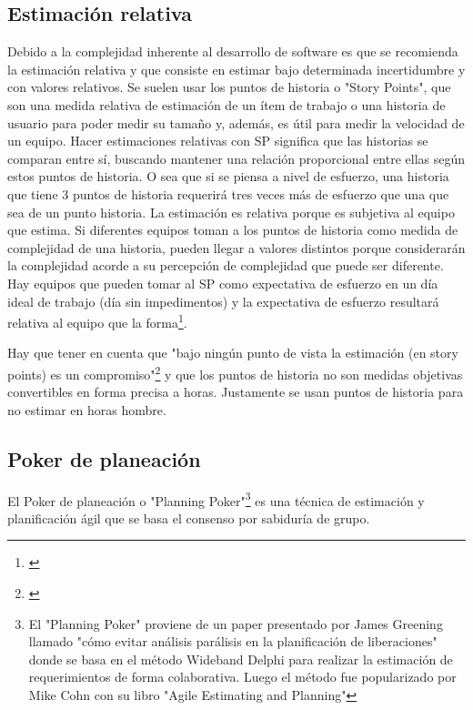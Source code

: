 \subsection{Estimación relativa}

Debido a la complejidad inherente al desarrollo de software es que se recomienda la estimación relativa y que consiste en estimar bajo determinada incertidumbre y con valores relativos. Se suelen usar los puntos de historia o "Story Points", que son una medida relativa de estimación de un ítem de trabajo o una historia de usuario para poder medir su tamaño y, además, es útil para medir la velocidad de un equipo. Hacer estimaciones relativas con SP significa que las historias se comparan entre sí, buscando mantener una relación proporcional entre ellas según estos puntos de historia. O sea que si se piensa a nivel de esfuerzo, una historia que tiene 3 puntos de historia requerirá tres veces más de esfuerzo que una que sea de un punto historia.
La estimación es relativa porque es subjetiva al equipo que estima. Si diferentes equipos toman a los puntos de historia como medida de complejidad de una historia, pueden llegar a valores distintos porque considerarán la complejidad acorde a su percepción de complejidad que puede ser diferente. Hay equipos que pueden tomar al SP como expectativa de esfuerzo en un día ideal de trabajo (día sin impedimentos) y la expectativa de esfuerzo resultará relativa al equipo que la forma\footnote{\cite{Cohn-2004}}.

Hay que tener en cuenta que "bajo ningún punto de vista la estimación (en story points) es un compromiso"\footnote{\cite{UNTREF-2014}} y que los puntos de historia no son medidas objetivas convertibles en forma precisa a horas. Justamente se usan puntos de historia para no estimar en horas hombre.

\subsection{Poker de planeación}

El Poker de planeación o "Planning Poker"\footnote{El "Planning Poker" proviene de un paper presentado por James Greening llamado "cómo evitar análisis parálisis en la planificación de liberaciones"\cite{James-Grenning-2002} donde se basa en el método Wideband Delphi para realizar la estimación de requerimientos de forma colaborativa. Luego el método fue popularizado por Mike Cohn con su libro "Agile Estimating and Planning"\cite{Cohn-2005}} es una técnica de estimación y planificación ágil que se basa el consenso por sabiduría de grupo. 

